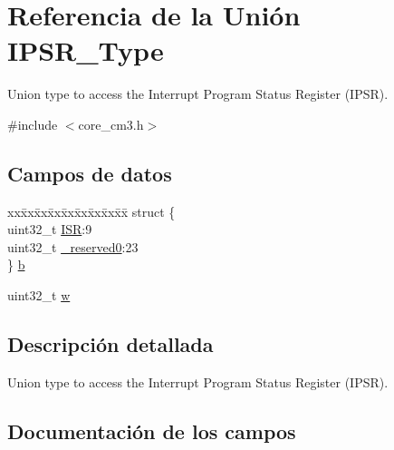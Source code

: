 \hypertarget{union_i_p_s_r___type}{}\section{Referencia de la Unión I\+P\+S\+R\+\_\+\+Type}
\label{union_i_p_s_r___type}


Union type to access the Interrupt Program Status Register (I\+P\+SR).  




{\ttfamily \#include $<$core\+\_\+cm3.\+h$>$}

\subsection*{Campos de datos}
\begin{DoxyCompactItemize}
\item 
\begin{tabbing}
xx\=xx\=xx\=xx\=xx\=xx\=xx\=xx\=xx\=\kill
struct \{\\
\>uint32\_t \mbox{\hyperlink{union_i_p_s_r___type_ad502ba7dbb2aab5f87c782b28f02622d}{ISR}}:9\\
\>uint32\_t \mbox{\hyperlink{union_i_p_s_r___type_ac8a6a13838a897c8d0b8bc991bbaf7c1}{\_reserved0}}:23\\
\} \mbox{\hyperlink{union_i_p_s_r___type_a3758147356a15906221a5625a27d9048}{b}}\\

\end{tabbing}\item 
uint32\+\_\+t \mbox{\hyperlink{union_i_p_s_r___type_ad0fb62e7a08e70fc5e0a76b67809f84b}{w}}
\end{DoxyCompactItemize}


\subsection{Descripción detallada}
Union type to access the Interrupt Program Status Register (I\+P\+SR). 

\subsection{Documentación de los campos}
\mbox{\label{union_i_p_s_r___type_ac8a6a13838a897c8d0b8bc991bbaf7c1}} 
